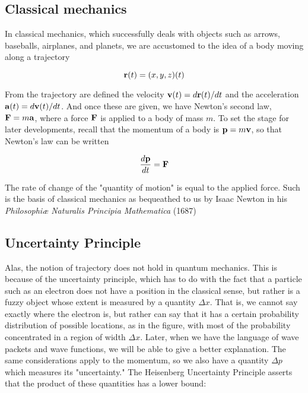 \subsection{Classical mechanics}

In classical mechanics, which successfully deals with objects such as arrows, baseballs, airplanes, and planets, we are accustomed to the idea of a body moving along a trajectory

\begin{equation}
{\bf r}(t) = (x,y,z)(t)
\end{equation}


From the trajectory are defined the velocity ${\bf v}(t) = d{\bf r}(t)/dt$ and the acceleration ${\bf a}(t) = d{\bf v}(t)/dt$.  And once these are given, we have Newton's second law, ${\bf F} = m{\bf a}$, where a force ${\bf F}$ is applied to a body of mass $m$. To set the stage for later developments, recall that the momentum of a body is ${\bf p} = m{\bf v}$, so that Newton's law can be written

\begin{equation}
\frac{d{\bf p}}{dt} = {\bf F}
\end{equation}

The rate of change of the "quantity of motion" is equal to the applied force.  Such is the basis of classical mechanics as bequeathed to us by Isaac Newton in his \emph{Philosophiæ Naturalis Principia Mathematica} (1687)

\subsection{Uncertainty Principle}

Alas, the notion of trajectory does not hold in quantum mechanics.  This is because of the uncertainty principle, which has to do with the fact that a particle such as an electron does not have a position in the classical sense, but rather is a fuzzy object whose extent is measured by a quantity $\Delta x$. That is, we cannot say exactly where the electron is, but rather can say that it has a certain probability distribution of possible locations, as in the figure, with most of the probability concentrated in a region of width $\Delta x$.  Later, when we have the language of wave packets and wave functions,  we will be able to give a better explanation.  The same considerations apply to the momentum, so we also have a quantity $\Delta p$ which measures its "uncertainty."  The Heisenberg Uncertainty Principle asserts that the product of these quantities has a lower bound:




